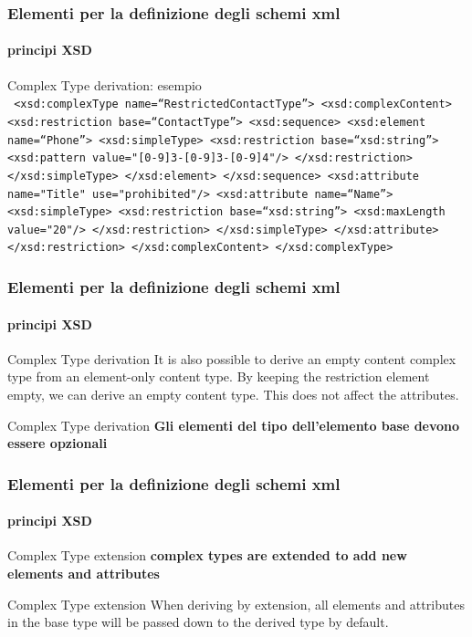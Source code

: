 \begin{frame}
	\frametitle{Elementi per la definizione degli schemi xml}
	\framesubtitle{principi XSD}
	\addtocounter{nframe}{1}

	\begin{block}{Complex Type derivation: esempio}
		\\\texttt{   <xsd:complexType name=``RestrictedContactType''>
		<xsd:complexContent>
		<xsd:restriction base=``ContactType''>
		<xsd:sequence>
		<xsd:element name=``Phone''>
		<xsd:simpleType>
		<xsd:restriction base=``xsd:string''>
		<xsd:pattern value="[0-9]{3}-[0-9]{3}-[0-9]{4}"/>
		</xsd:restriction>
		</xsd:simpleType>
		</xsd:element>
		</xsd:sequence>
		<xsd:attribute name="Title" use="prohibited"/>
		<xsd:attribute name=``Name''>
		<xsd:simpleType>
		<xsd:restriction base=``xsd:string''>
		<xsd:maxLength value="20"/>
		</xsd:restriction>
		</xsd:simpleType>
		</xsd:attribute>
		</xsd:restriction>
		</xsd:complexContent>
		</xsd:complexType>}
	\end{block}
\end{frame}


\begin{frame}
	\frametitle{Elementi per la definizione degli schemi xml}
	\framesubtitle{principi XSD}
	\addtocounter{nframe}{1}

	\begin{block}{Complex Type derivation}
		It is also possible to derive an empty content complex type from an element-only content type. By keeping the restriction element empty, we can derive an empty content type. This does not affect the attributes.
	\end{block}

	\begin{block}{Complex Type derivation}
		\textbf{Gli elementi del tipo dell'elemento base devono essere opzionali}
	\end{block}
\end{frame}


\begin{frame}
	\frametitle{Elementi per la definizione degli schemi xml}
	\framesubtitle{principi XSD}
	\addtocounter{nframe}{1}

	\begin{block}{Complex Type extension}
		\textbf{complex types are extended to add new elements and attributes}
	\end{block}

	\begin{block}{Complex Type extension}
		When deriving by extension, all elements and attributes in the base type will be passed down to the derived type by default.
	\end{block}
\end{frame}


